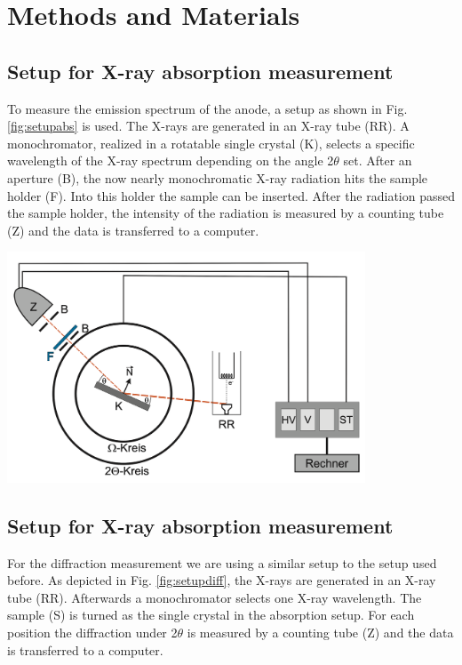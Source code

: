 
\chapter{Methods and Materials}
\label{chap:methods}


\section{Setup for X-ray absorption measurement}
\label{sec:SetupAbsorb}

To measure the emission spectrum of the anode, a setup as shown in Fig. \ref{fig:setupabs} is used. The X-rays are generated in an X-ray tube (RR). A monochromator, realized in a rotatable single crystal (K), 
selects a specific wavelength of the X-ray spectrum depending on the angle 2$\theta$ set. After an aperture (B), the now nearly monochromatic X-ray radiation hits the sample holder (F). Into this holder the sample
can be inserted. After the radiation passed the sample holder, the intensity of the radiation is measured by a counting tube (Z) and the data is transferred to a computer.

\begin{center}
    \captionsetup{type = figure}
    \includegraphics[width = 0.8\textwidth]{Pictures/SetupAbsorb.png}
    \label{fig:setupabs}
\end{center}

\newpage
\section{Setup for X-ray absorption measurement}
\label{sec:SetupDiff}

For the diffraction measurement we are using a similar setup to the setup used before. As depicted in Fig. \ref{fig:setupdiff}, the X-rays are generated in an X-ray tube (RR). Afterwards a monochromator selects one X-ray wavelength. 
The sample (S) is turned as the single crystal in the absorption setup. For each position the diffraction under 2$\theta$ is measured by a counting tube (Z) and the data is transferred to a computer.

